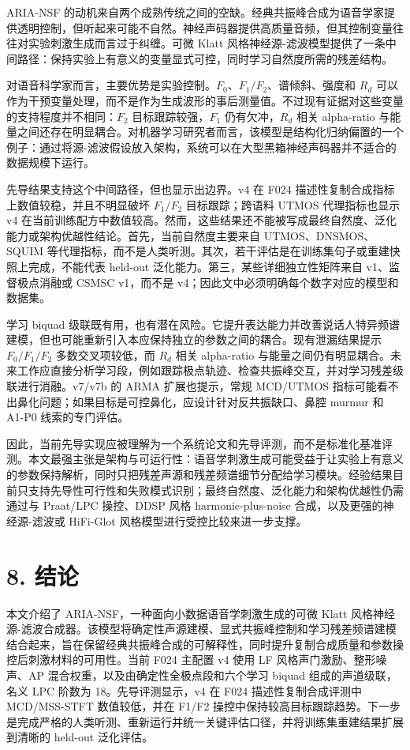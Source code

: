 ARIA-NSF
的动机来自两个成熟传统之间的空缺。经典共振峰合成为语音学家提供透明控制，但听起来可能不自然。神经声码器提供高质量音频，但其控制变量往往对实验刺激生成而言过于纠缠。可微
Klatt
风格神经源-滤波模型提供了一条中间路径：保持实验上有意义的变量显式可控，同时学习自然度所需的残差结构。

对语音科学家而言，主要优势是实验控制。\(F_0\)、\(F_1/F_2\)、谱倾斜、强度和
\(R_d\)
可以作为干预变量处理，而不是作为生成波形的事后测量值。不过现有证据对这些变量的支持程度并不相同：\(F_2\)
目标跟踪较强，\(F_1\) 仍有欠冲，\(R_d\) 相关 alpha-ratio
与能量之间还存在明显耦合。对机器学习研究者而言，该模型是结构化归纳偏置的一个例子：通过将源-滤波假设放入架构，系统可以在大型黑箱神经声码器并不适合的数据规模下运行。

先导结果支持这个中间路径，但也显示出边界。v4 在 F024
描述性复制合成指标上数值较稳，并且不明显破坏 \(F_1/F_2\)
目标跟踪；跨语料 UTMOS 代理指标也显示 v4
在当前训练配方中数值较高。然而，这些结果还不能被写成最终自然度、泛化能力或架构优越性结论。首先，当前自然度主要来自
UTMOS、DNSMOS、SQUIM
等代理指标，而不是人类听测。其次，若干评估是在训练集句子或重建快照上完成，不能代表
held-out 泛化能力。第三，某些详细独立性矩阵来自 v1、监督极点消融或 CSMSC
v1，而不是 v4；因此文中必须明确每个数字对应的模型和数据集。

学习 biquad
级联既有用，也有潜在风险。它提升表达能力并改善说话人特异频谱建模，但也可能重新引入本应保持独立的参数之间的耦合。现有泄漏结果提示
\(F_0/F_1/F_2\) 多数交叉项较低，而 \(R_d\) 相关 alpha-ratio
与能量之间仍有明显耦合。未来工作应直接分析学习段，例如跟踪极点轨迹、检查共振峰交互，并对学习残差级联进行消融。v7/v7b
的 ARMA 扩展也提示，常规 MCD/UTMOS
指标可能看不出鼻化问题；如果目标是可控鼻化，应设计针对反共振缺口、鼻腔
murmur 和 A1-P0 线索的专门评估。

因此，当前先导实现应被理解为一个系统论文和先导评测，而不是标准化基准评测。本文最强主张是架构与可运行性：语音学刺激生成可能受益于让实验上有意义的参数保持解析，同时只把残差声源和残差频谱细节分配给学习模块。经验结果目前只支持先导性可行性和失败模式识别；最终自然度、泛化能力和架构优越性仍需通过与
Praat/LPC 操控、DDSP 风格 harmonic-plus-noise
合成，以及更强的神经源-滤波或 HiFi-Glot
风格模型进行受控比较来进一步支撑。

\section{8. 结论}\label{ux7ed3ux8bba}

本文介绍了 ARIA-NSF，一种面向小数据语音学刺激生成的可微 Klatt
风格神经源-滤波合成器。该模型将确定性声源建模、显式共振峰控制和学习残差频谱建模结合起来，旨在保留经典共振峰合成的可解释性，同时提升复制合成质量和参数操控后刺激材料的可用性。当前
F024 主配置 v4 使用 LF 风格声门激励、整形噪声、AP
混合权重，以及由确定性全极点段和六个学习 biquad 组成的声道级联，名义 LPC
阶数为 18。先导评测显示，v4 在 F024 描述性复制合成评测中 MCD/MSS-STFT
数值较低，并在 F1/F2
操控中保持较高目标跟踪趋势。下一步是完成严格的人类听测、重新运行并统一关键评估口径，并将训练集重建结果扩展到清晰的
held-out 泛化评估。

